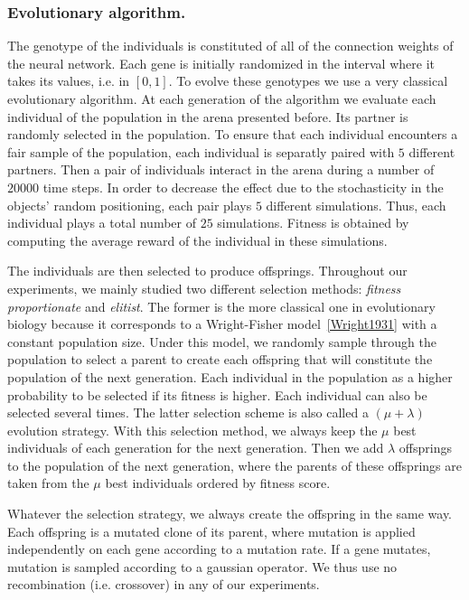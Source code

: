     \subsubsection{Evolutionary algorithm.} The genotype of the individuals is constituted of all of the connection weights of the neural network. Each gene is initially randomized in the interval where it takes its values, i.e. in \([0,1]\). To evolve these genotypes we use a very classical evolutionary algorithm. At each generation of the algorithm we evaluate each individual of the population in the arena presented before. Its partner is randomly selected in the population. To ensure that each individual encounters a fair sample of the population, each individual is separatly paired with $5$ different partners. Then a pair of individuals interact in the arena during a number of $20000$ time steps. In order to decrease the effect due to the stochasticity in the objects' random positioning, each pair plays $5$ different simulations. Thus, each individual plays a total number of $25$ simulations. Fitness is obtained by computing the average reward of the individual in these simulations.

    The individuals are then selected to produce offsprings. Throughout our experiments, we mainly studied two different selection methods: \emph{fitness proportionate} and \emph{elitist}. The former is the more classical one in evolutionary biology because it corresponds to a Wright-Fisher model~\ref{Wright1931} with a constant population size. Under this model, we randomly sample through the population to select a parent to create each offspring that will constitute the population of the next generation. Each individual in the population as a higher probability to be selected if its fitness is higher. Each individual can also be selected several times. The latter selection scheme is also called a \((\mu + \lambda)\) evolution strategy. With this selection method, we always keep the $\mu$ best individuals of each generation for the next generation. Then we add $\lambda$ offsprings to the population of the next generation, where the parents of these offsprings are taken from the $\mu$ best individuals ordered by fitness score.


    Whatever the selection strategy, we always create the offspring in the same way. Each offspring is a mutated clone of its parent, where mutation is applied independently on each gene according to a mutation rate. If a gene mutates, mutation is sampled according to a gaussian operator. We thus use no recombination (i.e. crossover) in any of our experiments.


